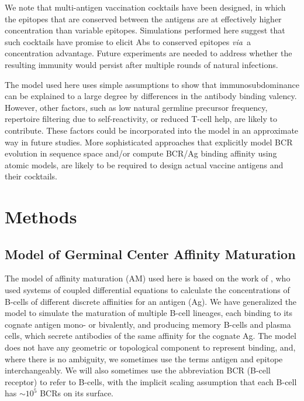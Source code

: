 \documentclass[utf8]{frontiersHLTH}%
\def\via {{\it via}}
\begin{document}
We note that multi-antigen vaccination cocktails have been
designed,\cite{kanekiyo19,cohen21,glanville20} in which the
epitopes that are conserved between the antigens are at effectively
higher concentration than variable epitopes. Simulations
performed here suggest that such cocktails have promise to elicit Abs to
conserved epitopes \via~a concentration advantage.  Future experiments are
needed to address
whether the resulting immunity would persist after multiple rounds of
natural infections.

The model used here uses simple assumptions to show that
immunosubdominance can be explained to a large degree by differences in
the antibody binding valency. However, other factors, such as low
natural germline precursor frequency, repertoire filtering due to
self-reactivity, or reduced T-cell help, are likely to contribute. These
factors could be incorporated into the model in an approximate way in
future studies.
More sophisticated approaches that explicitly model BCR evolution in
sequence space and/or compute BCR/Ag binding affinity using atomic
models\cite{conti21,sprenger21}, are likely to be required to design actual
vaccine antigens and their cocktails.
\section{Methods}
\label{sec:methods}

\subsection*{Model of Germinal Center Affinity Maturation}

The model of affinity maturation (AM) used here is based on the work of
\citet{kepler93},
who used systems of coupled
differential equations to calculate the concentrations of B-cells of
different discrete affinities for an antigen (Ag). %
We have generalized the model to
simulate the maturation of multiple B-cell lineages, each binding to its cognate
antigen mono- or bivalently, and producing memory B-cells and plasma
cells, which secrete antibodies of the same affinity for the cognate Ag. The model does not have any
geometric or topological component to represent binding, and, where there is no ambiguity, we sometimes use
the terms antigen and epitope interchangeably. We will also sometimes use
the abbreviation BCR (B-cell receptor) to refer to B-cells, with the implicit
scaling assumption that each B-cell has $\sim10^5$ BCRs on its surface.\cite{casten88,Alberts02}
\end{document}
